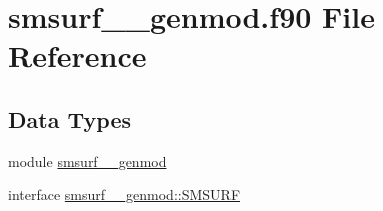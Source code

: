 \hypertarget{smsurf____genmod_8f90}{\section{smsurf\+\_\+\+\_\+genmod.\+f90 File Reference}
\label{smsurf____genmod_8f90}
}
\subsection*{Data Types}
\begin{DoxyCompactItemize}
\item 
module \hyperlink{classsmsurf____genmod}{smsurf\+\_\+\+\_\+genmod}
\item 
interface \hyperlink{interfacesmsurf____genmod_1_1SMSURF}{smsurf\+\_\+\+\_\+genmod\+::\+S\+M\+S\+U\+R\+F}
\end{DoxyCompactItemize}
